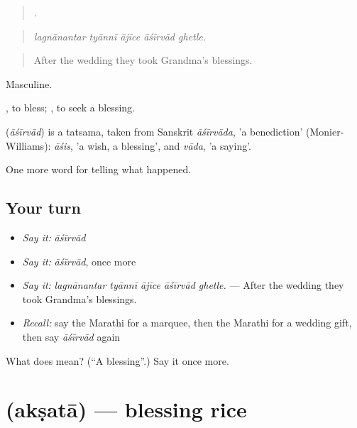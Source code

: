\begin{quote}
    .
\end{quote}

\begin{quote}
\emph{lagnānantar tyānnī ājīce āśīrvād ghetle.}
\end{quote}

\begin{quote}
After the wedding they took Grandma's blessings.
\end{quote}

Masculine.

 , to bless;  , to seek a blessing.

\begin{cousinweb}
\textbf{} (\emph{āśīrvād}) is a tatsama, taken from Sanskrit \emph{āśīrvāda}, 'a benediction' (Monier-Williams): \emph{āśis}, 'a wish, a blessing', and \emph{vāda}, 'a saying'.
\end{cousinweb}

\begin{grammarlens}[title={What you've built}]
One more word for telling what happened.
\end{grammarlens}

\subsection*{Your turn}
\begin{itemize}
\raggedright
  \item \emph{Say it:} \emph{āśīrvād}
  \item \emph{Say it:} \emph{āśīrvād}, once more
  \item \emph{Say it:} \emph{lagnānantar tyānnī ājīce āśīrvād ghetle.} — After the wedding they took Grandma's blessings.
  \item \emph{Recall:} say the Marathi for a marquee, then the Marathi for a wedding gift, then say \emph{āśīrvād} again
\end{itemize}

\begin{tcolorbox}[breakable,colback=teal!4,colframe=teal!35!black,title={Before you move on}]
What does  mean? (\textquotedblleft{}A blessing\textquotedblright{}.) Say it once more.
\end{tcolorbox}
\section[\texorpdfstring{\mr{अक्षता} (akṣatā)}{अक्षता (akṣatā)}]{ (akṣatā) — blessing rice}

